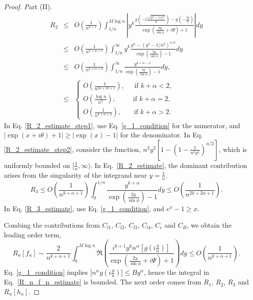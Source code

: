 \documentclass[11pt]{article}
\begin{document}
\begin{proof} {\textit Part (II).}
\begin{eqnarray}
    R_2& \leq &O(\frac{1}{ n^{k+1}})\int_{1/n}^{M\log n}  \left|y^{k}\frac{  g(-i\frac{\sqrt{y^2-1/n^2}}{n}) - g(-\frac{iy}{n})}{\exp\left(\frac{2y}{\sin\phi}+i\Psi\right) + 1} \right|dy \nonumber\\
    &\leq & O(\frac{1}{ n^{k+\alpha+1}})\int_{1/n}^{\infty}  y^{k}\frac{  y^\alpha - (y^2-1/n^2)^{\alpha/2} }{\exp\left(\frac{2y}{\sin\phi}\right) - 1} dy \label{R_2_estimate_step1}\\
    &\leq& 
        O(\frac{1}{ n^{k+\alpha+3}})\int_{1/n}^{\infty}  \frac{y^{k+\alpha-2}}{\exp\left(\frac{2y}{\sin\phi}\right) - 1} dy,\label{R_2_estimate_step2}\\
    &\leq& \begin{cases}
        O(\frac{1}{n^{2\alpha+2k+1}}), \ \ \ \ \  \text{ if } k+\alpha < 2,\\
        O(\frac{\log n}{n^{5}}), \ \ \ \ \ \ \ \ \ \  \text{ if } k+\alpha = 2,\\
        O(\frac{1}{n^{k+\alpha+3}}),\ \ \ \ \ \ \  \text{ if }  k+\alpha > 2.
    \end{cases}\label{R_2_estimate}
\end{eqnarray}
In Eq. \eqref{R_2_estimate_step1}, use Eq. \eqref{g_1_condition} for the numerator, and $|\exp\left(x+i\theta\right) + 1|\geq |\exp(x)-1|$ for the denominator. In Eq. \eqref{R_2_estimate_step2}, consider the function, $n^2y^2[1-(1-\frac{1}{n^2y^2})^{\alpha/2}]$, which is uniformly bounded on $[\frac{1}{n},\infty)$. In Eq.~\eqref{R_2_estimate}, the dominant contribution arises from the singularity of the integrand near $y=\frac{1}{n}$.
\begin{equation}
    R_3 \leq O(\frac{1}{ n^{k+\alpha+1}})\int_{0}^{1/n} \frac{ y^{k+\alpha} }{\exp\left(\frac{2y}{\sin\phi}\right) - 1} dy \leq O(\frac{1}{ n^{2k+2\alpha+1}}). \label{R_3_estimate}
\end{equation}
In Eq. \eqref{R_3_estimate}, use Eq. \eqref{g_1_condition}, and $e^x-1 \geq x$.

Combing the contributions from $C_{l1}$, $C_{l2}$, $C_{l3}$, $C_{l4}$, $C_\epsilon$ and $C_B$, we obtain the leading order term,
\begin{equation}
    R_n[f_n] \sim \frac{2}{ n^{k+\alpha+1}}\int_{0}^{M \log n} \Re\left(\frac{ i^{k+1}y^{k} n^{\alpha} \left[ g(i\frac{y}{n})\right] }{\exp\left(\frac{2y}{\sin\phi}+i\Psi\right) + 1} \right)dy \leq O(\frac{1}{ n^{k+\alpha+1}}).\label{R_n_f_n_estimate}
    \end{equation}
Eq. \eqref{g_1_condition} implies $\left|n^\alpha g(i\frac{y}{n}) \right| \leq B y^\alpha$, hence the integral in Eq.~\eqref{R_n_f_n_estimate} is bounded. The next order comes from $R_1$, $R_2$, $R_3$ and $R_n[h_n]$.
\end{proof}
\end{document}
